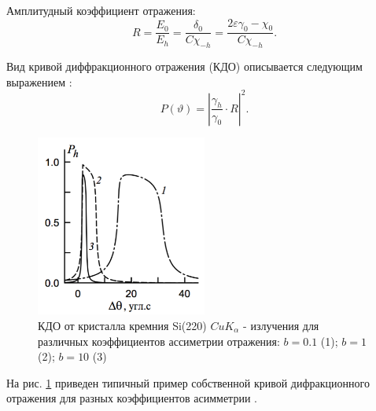 Амплитудный коэффициент отражения:
\begin{equation}
    R = \frac{E_0}{E_h} = \frac{\delta_0}{C\chi_{-h}} = \frac{2\varepsilon\gamma_0-\chi_0}{C\chi_{-h}}.
\end{equation}

Вид кривой диффракционного отражения (КДО) описывается следующим выражением \cite{Bushuev_Oreshko_2002}:
\begin{equation}
    \label{eq:KDO_self}
    P (\vartheta) =  |\frac{\gamma_h}{\gamma_0} \cdot R|^2.
\end{equation}

\begin{figure}[H]
  \centering
  \includegraphics[width=0.5\textwidth]{images/typical_rocking_curve.png}
  \caption{КДО от кристалла кремния Si(220) $CuK_{\alpha}$ - излучения для различных коэффициентов ассиметрии
  отражения: $b = 0.1$ (1); $b = 1$ (2); $b = 10$ (3)}
  \label{ris:typical_rocking_curve}
\end{figure}
На рис. \ref{ris:typical_rocking_curve} приведен типичный пример собственной кривой дифракционного отражения
для разных коэффициентов асимметрии \cite{Bushuev_Oreshko_2002}.
